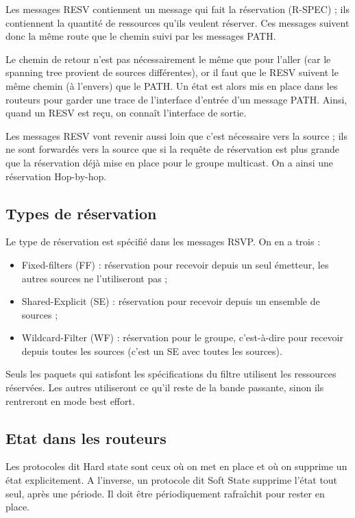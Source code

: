			Les messages RESV contiennent un message qui fait la réservation (R-SPEC) ; ils contiennent la quantité de ressources qu'ils veulent réserver. Ces messages suivent donc la même route que le chemin suivi par les messages PATH.
		
			
			Le chemin de retour n'est pas nécessairement le même que pour l'aller (car le spanning tree provient de sources différentes), or il faut que le RESV suivent le même chemin (à l'envers) que le PATH. Un état est alors mis en place dans les routeurs pour garder une trace de l'interface d'entrée d'un message PATH. Ainsi, quand un RESV est reçu, on connaît l'interface de sortie. 
		
			Les messages RESV vont revenir aussi loin que c'est nécessaire vers la source ; ils ne sont forwardés vers la source que si la requête de réservation est plus grande que la réservation déjà mise en place pour le groupe multicast. On a ainsi une réservation Hop-by-hop.
		
		
			\subsection{Types de réservation}
			
			Le type de réservation est spécifié dans les messages RSVP. On en a trois :
			
			\begin{itemize}
				\item Fixed-filters (FF) : réservation pour recevoir depuis un seul émetteur, les autres sources ne l'utiliseront pas ;
				\item Shared-Explicit (SE) : réservation pour recevoir depuis un ensemble de sources ;
				\item Wildcard-Filter (WF) : réservation pour le groupe, c'est-à-dire pour recevoir depuis toutes les sources (c'est un SE avec toutes les sources).
			\end{itemize}
			
			Seuls les paquets qui satisfont les spécifications du filtre utilisent les ressources réservées. Les autres utiliseront ce qu'il reste de la bande passante, sinon ils rentreront en mode best effort.
			
			\subsection{Etat dans les routeurs}
		
			Les protocoles dit Hard state sont ceux où on met en place et où on supprime un état explicitement. A l'inverse, un protocole dit Soft State supprime l'état tout seul, après une période. Il doit être périodiquement rafraîchit pour rester en place.
			
